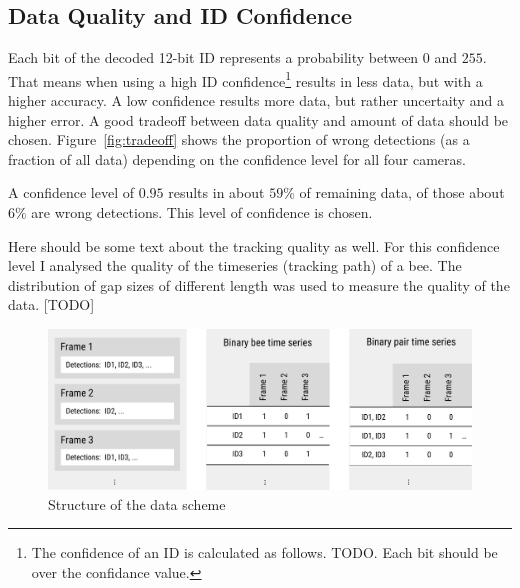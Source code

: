 \subsection{Data Quality and ID Confidence}

Each bit of the decoded 12-bit ID represents a probability between $0$ and $255$. That means when using a high ID confidence\footnote{The confidence of an ID is calculated as follows. TODO. Each bit should be over the confidance value.} results in less data, but with a higher accuracy.
A low confidence results more data, but rather uncertaity and a higher error. A good tradeoff between data quality and amount of data should be chosen. Figure~\ref{fig:tradeoff} shows the proportion of wrong detections (as a fraction of all data) depending on the confidence level for all four cameras.

A confidence level of $0.95$ results in about $59\%$ of remaining data, of those about $6\%$ are wrong detections. This level of confidence is chosen.

Here should be some text about the tracking quality as well. For this confidence level I analysed the quality of the timeseries (tracking path) of a bee. The distribution of gap sizes of different length was used to measure the quality of the data. [TODO]

\begin{figure}[htb]
	\centering
	\includegraphics[width=1.0\textwidth]{Figures/structure}
	\caption{Structure of the data scheme}
	\label{fig:scheme}
\end{figure}

